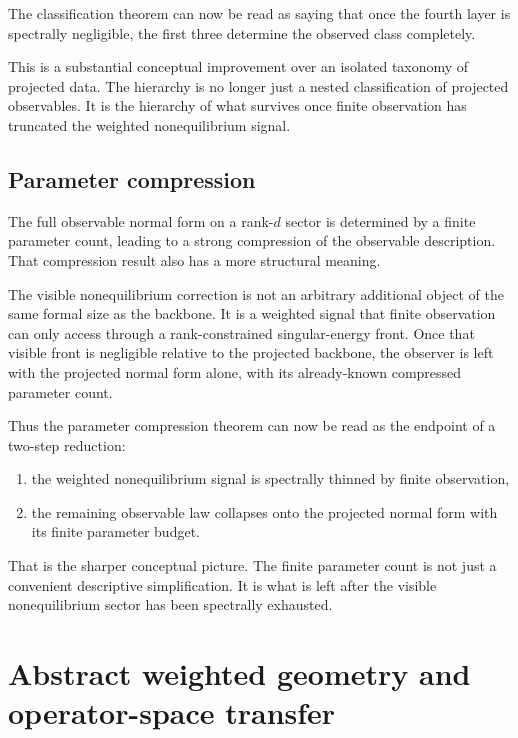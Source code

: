 \documentclass[11pt,a4paper]{article}
\numberwithin{equation}{section}
\theoremstyle{thmcompact}
\theoremstyle{remark}
\begin{document}
The classification theorem can now be read as saying that once the fourth layer is spectrally negligible, the first three determine the observed class completely.

This is a substantial conceptual improvement over an isolated taxonomy of projected data. The hierarchy is no longer just a nested classification of projected observables. It is the hierarchy of what survives once finite observation has truncated the weighted nonequilibrium signal.

\subsection{Parameter compression}

The full observable normal form on a rank-\(d\) sector is determined by a finite parameter count, leading to a strong compression of the observable description. That compression result also has a more structural meaning.

The visible nonequilibrium correction is not an arbitrary additional object of the same formal size as the backbone. It is a weighted signal that finite observation can only access through a rank-constrained singular-energy front. Once that visible front is negligible relative to the projected backbone, the observer is left with the projected normal form alone, with its already-known compressed parameter count.

Thus the parameter compression theorem can now be read as the endpoint of a two-step reduction:

\begin{enumerate}
\item the weighted nonequilibrium signal is spectrally thinned by finite observation,
\item the remaining observable law collapses onto the projected normal form with its finite parameter budget.
\end{enumerate}

That is the sharper conceptual picture. The finite parameter count is not just a convenient descriptive simplification. It is what is left after the visible nonequilibrium sector has been spectrally exhausted.

\section{Abstract weighted geometry and operator-space transfer}
\label{sec:abstract-weighted-geometry}
\end{document}
